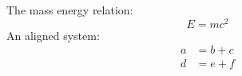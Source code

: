 \documentclass{article}
\begin{document}
The mass energy relation:
\begin{equation}
E = m c^2
\end{equation}
An aligned system:
\begin{align}
a &= b + c \\
d &= e + f
\end{align}
\end{document}
